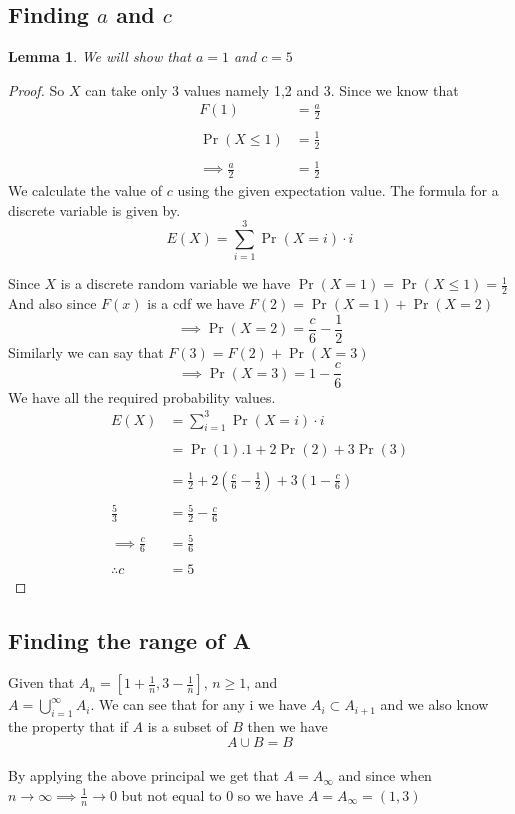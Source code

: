 \documentclass[journal,12pt,twocolumn]{IEEEtran}
\newtheorem{lemma}[theorem]{Lemma}
\providecommand{\brak}[1]{\ensuremath{\left(#1\right)}}
\begin{document}
\subsection{Finding $a$ and $c$}
\begin{lemma}
We will show that $a=1$ and $c=5$
\end{lemma}
\begin{proof}
So $X$ can take only 3 values namely 1,2 and 3.
Since we know that 
\begin{align}
 F\brak{1} &= \frac{a}{2}\\
\nonumber \\
 \Pr\brak{X\leq1} &= \frac{1}{2}\\
\nonumber \\
 \implies\frac{a}{2} &= \frac{1}{2}
\end{align}
 We calculate the value of $c$ using the given expectation value. The formula for a discrete variable is given by. 
$$E\brak{X} = \sum_{i=1}^{3}\Pr\brak{X=i}\cdot i$$

Since $X$ is a discrete random variable we have $\Pr\brak{X=1} = \Pr\brak{X\leq1} = \frac{1}{2}$\\And also since $F\brak{x}$ is a cdf we have $F\brak{2} = \Pr\brak{X=1}+\Pr\brak{X=2}$\\
$$\implies \Pr\brak{X=2} = \frac{c}{6}-\frac{1}{2}$$
Similarly we can say that $F\brak{3} = F\brak{2} + \Pr\brak{X=3}$
$$\implies \Pr\brak{X=3} = 1 - \frac{c}{6}$$
We have all the required probability values.
\begin{align}
 E\brak{X} &= \sum_{i=1}^{3}\Pr\brak{X=i}\cdot i\\
\nonumber \\
 &= \Pr\brak{1}.1 +2\Pr\brak{2} + 3\Pr\brak{3}\\
\nonumber \\
 &= \frac{1}{2}+ 2\brak{\frac{c}{6}-\frac{1}{2}}+3\brak{1-\frac{c}{6}}\\
\nonumber \\
\frac{5}{3} &= \frac{5}{2} - \frac{c}{6}\\
\nonumber \\
 \implies\frac{c}{6} &= \frac{5}{6}\\
\nonumber \\
 \therefore c &= 5
\end{align}
\end{proof}



\subsection{Finding the range of A}
Given that $A_n = \left[1+\frac{1}{n},3-\frac{1}{n}\right]$, $n\geq1$, and \\$A = \bigcup_{i=1}^{\infty}A_i$. We can see  that for any i we have $A_i \subset A_{i+1}$ and we also know the property that if $A$ is a subset of $B$ then we have $$A\cup B = B$$\\
By applying the above principal we get that $A = A_\infty$ and since when $n \rightarrow \infty \implies \frac{1}{n} \rightarrow 0$ but not equal to 0 so we have $A = A_\infty = \brak{1,3}$
\end{document}
